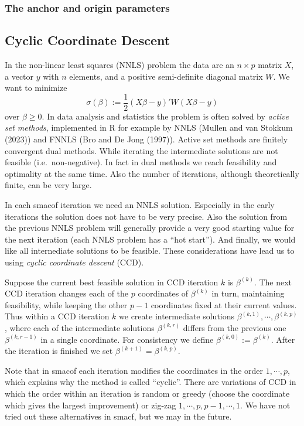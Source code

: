 \documentclass[
  12pt,
]{article}
\begin{document}
\subsubsection{The anchor and origin parameters}\label{the-anchor-and-origin-parameters}

\subsection{Cyclic Coordinate Descent}\label{cyclic-coordinate-descent}

In the non-linear least squares (NNLS) problem the data are an \(n\times p\) matrix
\(X\), a vector \(y\) with \(n\) elements, and a positive semi-definite diagonal matrix
\(W\). We want to minimize
\[
\sigma(\beta):=\frac12(X\beta-y)'W(X\beta-y)
\]
over \(\beta\geq 0\). In data analysis and statistics the problem is often solved by
\emph{active set methods}, implemented in R for example by NNLS (Mullen and van Stokkum (2023)) and FNNLS (Bro and De Jong (1997)). Active set methods are finitely convergent dual methods. While iterating the intermediate solutions are not feasible (i.e.~non-negative). In fact
in dual methods we reach feasibility and optimality at the same time. Also the number of iterations, although theoretically finite, can be very large.

In each smacof iteration we need an NNLS solution. Especially in the early iterations the solution does not have to be very precise. Also the solution from the previous
NNLS problem will generally provide a very good starting value for the next iteration
(each NNLS problem has a ``hot start''). And finally, we would like all internediate solutions to be feasible. These considerations have lead us to using
\emph{cyclic coordinate descent} (CCD).

Suppose the current best feasible solution in CCD iteration \(k\) is \(\beta^{(k)}\).
The next CCD iteration changes each of the \(p\) coordinates of \(\beta^{(k)}\) in turn, maintaining feasibility, while keeping the other \(p-1\) coordinates fixed at their current values. Thus within a CCD iteration \(k\) we create intermediate solutions \(\beta^{(k,1)},\cdots,\beta^{(k,p)}\), where each of the intermediate solutions \(\beta^{(k,r)}\) differs from the previous one \(\beta^{(k,r-1)}\) in a single coordinate.
For consistency we define \(\beta^{(k,0)}:=\beta^{(k)}\). After the iteration is finished
we set \(\beta^{(k+1)}=\beta^{(k,p)}\).

Note that in smacof each iteration modifies the coordinates in the order \(1,\cdots,p\), which explains why the method is called ``cyclic''. There are variations of CCD in which the order within an iteration is random or greedy (choose the coordinate which gives the largest improvement) or zig-zag \(1,\cdots,p,p-1,\cdots,1\). We have not tried out these alternatives in smacf, but we may in the future.
\end{document}
